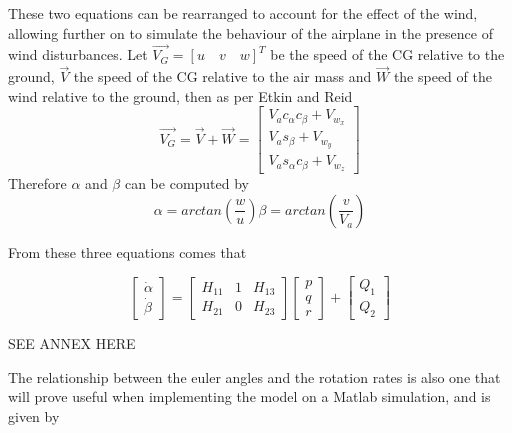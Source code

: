 These two equations can be rearranged to account for the effect of the wind, allowing further on to simulate the behaviour of the airplane in the presence of wind disturbances. Let $\vec{V_G} = [u \quad v \quad w]^T$ be the speed of the CG relative to the ground, $\vec{V}$ the speed of the CG relative to the air mass and $\vec{W}$ the speed of the wind relative to the ground, then as per Etkin and Reid \cite{Etkin+Reid} 
\begin{equation}
\vec{V_G} = \vec{V} + \vec{W} = 
\begin{bmatrix}
V_ac_\alpha c_\beta + V_{w_x}\\
V_as_\beta+V_{w_y}\\
V_as_\alpha c_\beta + V_{w_z}
\end{bmatrix}
\label{eq:windtriangle}
\end{equation}
Therefore $\alpha$ and $\beta$ can be computed by 
\begin{subequations}
	\begin{equation}
		\alpha = arctan\left(\dfrac{w}{u}\right)
		\label{eq:alpha}
	\end{equation}
	\begin{equation}
		\beta = arctan\left(\dfrac{v}{V_a}\right)
		\label{eq:beta}
	\end{equation}
\end{subequations}

From these three equations comes that 

\begin{equation}
\begin{bmatrix}
\dot{\alpha}\\
\dot{\beta}
\end{bmatrix}
= 
\begin{bmatrix}
H_{11} & 1 & H_{13}\\
H_{21} & 0 & H_{23}
\end{bmatrix}
\begin{bmatrix}
p\\
q\\
r
\end{bmatrix}
+
\begin{bmatrix}
Q_1\\
Q_2
\end{bmatrix}
\label{eq:alphabetadot}
\end{equation}

SEE ANNEX HERE

The relationship between the euler angles and the rotation rates is also one that will prove useful when implementing the model on a Matlab simulation, and is given by

